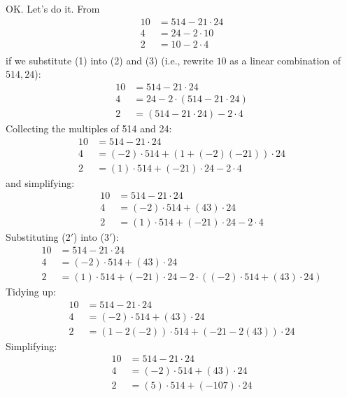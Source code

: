 OK. Let's do it.
From
\begin{align*}
10 &= 514 - 21 \cdot 24 \tag{1} \\
4  &= 24  - 2 \cdot 10  \tag{2} \\
2  &= 10  - 2 \cdot 4   \tag{3} \\
\end{align*}
if we substitute (1) into (2) and (3) (i.e., rewrite $10$ as a linear
combination of $514,24$):
\begin{align*}
10 &= 514 - 21 \cdot 24 \tag{1} \\
4  &= 24  - 2 \cdot (514 - 21 \cdot 24)  \tag{2} \\
2  &= (514 - 21 \cdot 24)  - 2 \cdot 4   \tag{3} 
\end{align*}
Collecting the multiples of 514 and 24:
\begin{align*}
10 &= 514 - 21 \cdot 24 \tag{1} \\
4  &= (-2) \cdot 514 + (1 + (-2)(-21)) \cdot 24  \tag{2'} \\
2  &= (1) \cdot 514 + (-21) \cdot 24  - 2 \cdot 4   \tag{3'} 
\end{align*}
and simplifying:
\begin{align*}
10 &= 514 - 21 \cdot 24 \tag{1} \\
4  &= (-2) \cdot 514 + (43) \cdot 24  \tag{2'} \\
2  &= (1) \cdot 514 + (-21) \cdot 24  - 2 \cdot 4   \tag{3'} 
\end{align*}
Substituting (2$'$) into (3$'$):
\begin{align*}
10 &= 514 - 21 \cdot 24 \tag{1} \\
4  &= (-2) \cdot 514 + (43) \cdot 24  \tag{2'} \\
2  &= (1) \cdot 514 + (-21) \cdot 24  - 2 \cdot ((-2) \cdot 514 + (43) \cdot 24)  \tag{3'} 
\end{align*}
Tidying up:
\begin{align*}
10 &= 514 - 21 \cdot 24 \tag{1} \\
4  &= (-2) \cdot 514 + (43) \cdot 24  \tag{2'} \\
2  &= (1 - 2(-2)) \cdot 514 + (-21 - 2(43)) \cdot 24 \tag{3''} 
\end{align*}
Simplifying:
\begin{align*}
10 &= 514 - 21 \cdot 24 \tag{1} \\
4  &= (-2) \cdot 514 + (43) \cdot 24  \tag{2'} \\
2  &= (5) \cdot 514 + (-107) \cdot 24 \tag{3''}
\end{align*}

